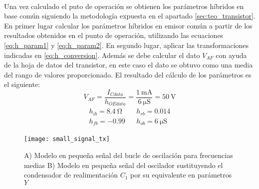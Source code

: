 \paragraph{}
Una vez calculado el puto de operaci\'on se obtienen los par\'ametros h\'ibridos en base com\'un siguiendo la metodolog\'ia expuesta en el apartado \ref{sec:teo_transistor}. En primer lugar calcular los parámetros híbridos en emisor común a partir de los resultados obtenidos en el punto de operación, utilizando las ecuaciones \ref{eq:h_param1} y \ref{eq:h_param2}. En segundo lugar, aplicar las transformaciones indicadas en \ref{eq:h_conversion}. Adem\'as se debe calcular el dato $V_{AF}$ con ayuda de la hoja de datos del transistor, en este caso el dato se obtuvo como una media del rango de valores proporcionado. El resultado del c\'alculo de los par\'ametros es el siguiente:
\begin{equation}
   \label{eq:result_pol1}
V_{AF} = \frac{I_{Cdata}}{h_{OEdata}} =\frac{\SI{1}{\milli\ampere}}{\SI{6}{\micro\siemens}} =  \SI{50}{\volt} 
\end{equation}
\begin{equation}
   \label{eq:result_pol2}
\begin{array}{rl} 
      \begin{array}{l}
	 h_{ib} =  \SI{8.4}{\ohm} \\
	 h_{fb} =  -0.99
      \end{array}
      &
      \begin{array}{l}
	 h_{rb} =  0.014 \\
	 h_{ob} =  \SI{6}{\micro\siemens}
      \end{array}
\end{array}
\end{equation}

\begin{figure}[h]
    \centering
    \texttt{[image: small\_signal\_tx]}
    \caption{A) Modelo en pequeña señal del bucle de oscilación para frecuencias medias B) Modelo en pequeña señal del oscilador sustituyendo el condensador de realimentación $C_1$ por su equivalente en parámetros $Y$}
    \label{fig:ss_tx}
\end{figure}

